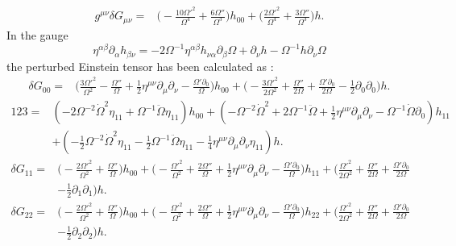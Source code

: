 \documentclass[10pt,letterpaper]{article}
\begin{document}
\begin{align}
g^{\mu\nu}\delta G_{\mu\nu}={}&\bigg(- \frac{10 \Omega '^2}{\Omega^4}
 + \frac{6 \Omega ''}{\Omega^3}\bigg) h_{00}
 + \bigg(\frac{2 \Omega '^2}{\Omega^4}
 + \frac{3 \Omega ''}{\Omega^3}\bigg) h.
\end{align}
In the gauge
\begin{equation}
	\eta^{\alpha\beta}\partial_{\alpha}h_{\beta\nu} = -2 \Omega^{-1}  \eta^{\alpha\beta}h_{\nu\alpha}\partial_\beta \Omega +  \partial_\nu h - \Omega^{-1} h \partial_\nu \Omega
\end{equation}
the perturbed Einstein tensor has been calculated as :
\begin{align}
\delta G_{00}={}&\bigg(\frac{3 \Omega '^2}{\Omega^2}
 -  \frac{\Omega ''}{\Omega}
 + \tfrac{1}{2} \eta^{\mu \nu} \partial_{\mu} \partial_{\nu}
 -  \frac{\Omega ' \partial_{0}}{\Omega}\bigg) h_{00}
 + \bigg(- \frac{3 \Omega '^2}{2 \Omega^2}
 + \frac{\Omega ''}{2 \Omega}
 + \frac{\Omega ' \partial_{0}}{2 \Omega}
 -  \tfrac{1}{2} \partial_{0} \partial_{0}\bigg) h.
\end{align}
\begin{align}
123={}&(-2 \Omega^{-2} \dot{\Omega}^2 \eta_{11}
 + \Omega^{-1} \ddot{\Omega} \eta_{11}) h_{00}
 + (- \Omega^{-2} \dot{\Omega}^2
 + 2 \Omega^{-1} \ddot{\Omega}
 + \tfrac{1}{2} \eta^{\mu \nu} \partial_{\mu} \partial_{\nu}
 -  \Omega^{-1} \dot{\Omega} \partial_{0}) h_{11}\nonumber\\
& + (- \tfrac{1}{2} \Omega^{-2} \dot{\Omega}^2 \eta_{11}
 -  \tfrac{1}{2} \Omega^{-1} \ddot{\Omega} \eta_{11}
 -  \tfrac{1}{4} \eta^{\mu \nu} \partial_{\mu} \partial_{\nu} \eta_{11}) h.
\end{align}
\begin{align}
\delta G_{11}={}&\bigg(- \frac{2 \Omega '^2}{\Omega^2}
 + \frac{\Omega ''}{\Omega}\bigg) h_{00}
 + \bigg(- \frac{\Omega '^2}{\Omega^2}
 + \frac{2 \Omega ''}{\Omega}
 + \tfrac{1}{2} \eta^{\mu \nu} \partial_{\mu} \partial_{\nu}
 -  \frac{\Omega ' \partial_{0}}{\Omega}\bigg) h_{11}
 + \bigg(\frac{\Omega '^2}{2 \Omega^2}
 + \frac{\Omega ''}{2 \Omega}
 + \frac{\Omega ' \partial_{0}}{2 \Omega}\nonumber\\
& -  \tfrac{1}{2} \partial_{1} \partial_{1}\bigg) h.
\end{align}
\begin{align}
\delta G_{22}={}&\bigg(- \frac{2 \Omega '^2}{\Omega^2}
 + \frac{\Omega ''}{\Omega}\bigg) h_{00}
 + \bigg(- \frac{\Omega '^2}{\Omega^2}
 + \frac{2 \Omega ''}{\Omega}
 + \tfrac{1}{2} \eta^{\mu \nu} \partial_{\mu} \partial_{\nu}
 -  \frac{\Omega ' \partial_{0}}{\Omega}\bigg) h_{22}
 + \bigg(\frac{\Omega '^2}{2 \Omega^2}
 + \frac{\Omega ''}{2 \Omega}
 + \frac{\Omega ' \partial_{0}}{2 \Omega}\nonumber\\
& -  \tfrac{1}{2} \partial_{2} \partial_{2}\bigg) h.
\end{align}
\end{document}
